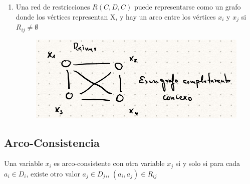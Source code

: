 \documentclass[12pt, twoside, openright]{report} %
\begin{document}
\begin{enumerate}
	\item
    Una red de restricciones \(R(C, D, C)\) puede representarse como un
    grafo donde los vértices representan X, y hay un arco entre los
    vértices \(x_i\) y \(x_j\) si \(R_{ij} \neq \emptyset\)
	\begin{figure}[H]
		{\includegraphics[scale=.35]{Untitled 36.png}}
	\end{figure}
\end{enumerate}


\subsection{Arco-Consistencia}

Una variable \(x_i\) es arco-consistente con otra variable \(x_j\) si
  y solo si para cada \(a_i \in D_i\), existe otro valor
  \(a_j \in D_j\),, \((a_i,a_j) \in R_{ij}\)
\end{document}
